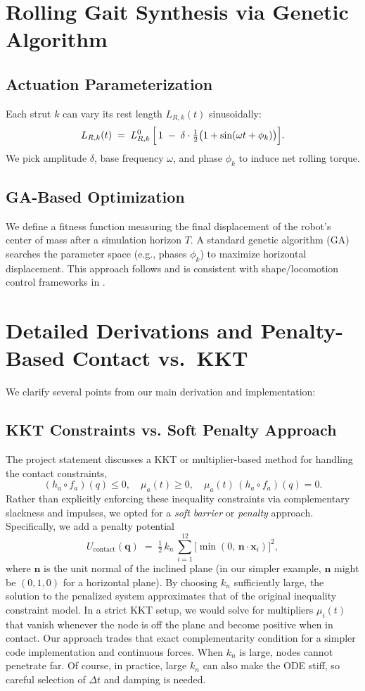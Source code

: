 \documentclass[12pt,letterpaper]{article}
\newcommand{\q}{\bm{q}}
\newcommand{\x}{\bm{x}}
\newcommand{\bfn}{\bm{n}}
\begin{document}
\section{Rolling Gait Synthesis via Genetic Algorithm}
\subsection{Actuation Parameterization}
Each strut $k$ can vary its rest length $L_{R,k}(t)$ sinusoidally:
\[
  L_{R,k}(t)
    \;=\;
    L_{R,k}^0\,\Bigl[\,1 \;-\;\delta \cdot \tfrac12\bigl(1+\sin(\omega t + \phi_k)\bigr)\Bigr].
\]
We pick amplitude $\delta$, base frequency $\omega$, and phase $\phi_k$ to induce net rolling torque.

\subsection{GA-Based Optimization}
We define a fitness function measuring the final displacement of the robot’s center of mass after a simulation horizon $T$. A standard genetic algorithm (GA) searches the parameter space (e.g., phases $\phi_k$) to maximize horizontal displacement.  This approach follows \cite{ZhengCaiWang2020Rolling} and is consistent with shape/locomotion control frameworks in \cite{Cai2020}.

\section{Detailed Derivations and Penalty-Based Contact vs.\ KKT}
\label{sec:appendix-deriv}
We clarify several points from our main derivation and implementation:

\subsection{KKT Constraints vs. Soft Penalty Approach}
The project statement discusses a KKT or multiplier-based method for handling the contact constraints,
\[
  (h_a \circ f_a)(q) \le 0,\quad \mu_a(t)\ge 0,\quad \mu_a(t)\,(h_a\circ f_a)(q)=0.
\]
Rather than explicitly enforcing these inequality constraints via complementary slackness and impulses, we opted for a \emph{soft barrier} or \emph{penalty} approach. Specifically, we add a penalty potential
\[
  U_{\mathrm{contact}}(\q) \;=\; \tfrac12\, k_{n}\,\sum_{i=1}^{12} \bigl[\min(0,\,\bfn \cdot \x_i)\bigr]^2,
\]
where $\bfn$ is the unit normal of the inclined plane (in our simpler example, $\bfn$ might be $(0,1,0)$ for a horizontal plane). By choosing $k_{n}$ sufficiently large, the solution to the penalized system approximates that of the original inequality constraint model. In a strict KKT setup, we would solve for multipliers $\mu_i(t)$ that vanish whenever the node is off the plane and become positive when in contact. Our approach trades that exact complementarity condition for a simpler code implementation and continuous forces. When $k_n$ is large, nodes cannot penetrate far. Of course, in practice, large $k_n$ can also make the ODE stiff, so careful selection of $\Delta t$ and damping is needed.
\end{document}
